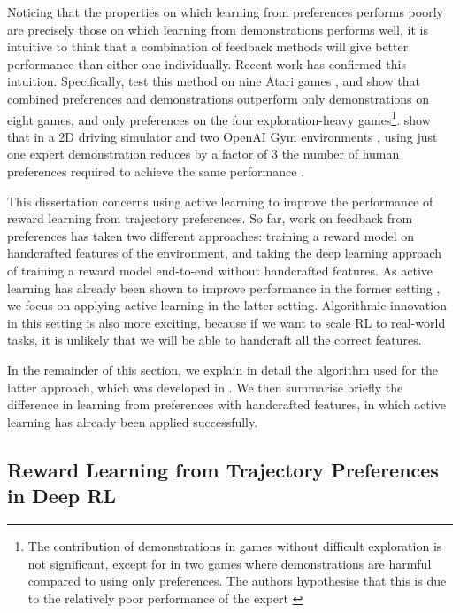 \documentclass[11pt, a4paper, bibliography=totoc]{report}
\begin{document}
Noticing that the properties on which learning from preferences performs poorly are precisely those on which learning from demonstrations performs well, it is intuitive to think that a combination of feedback methods will give better performance than either one individually. Recent work has confirmed this intuition. Specifically, \cite{Ibarz2018} test this method on nine Atari games \cite{bellemare2013arcade}, and show that combined preferences and demonstrations outperform only demonstrations on eight games, and only preferences on the four exploration-heavy games\footnote{The contribution of demonstrations in games without difficult exploration is not significant, except for in two games where demonstrations are harmful compared to using only preferences. The authors hypothesise that this is due to the relatively poor performance of the expert \cite[p.~6]{Ibarz2018}}. \cite{Palan2019} show that in a 2D driving simulator \cite{Byk2017} and two OpenAI Gym environments \cite{brockman2016gym}, using just one expert demonstration reduces by a factor of 3 the number of human preferences required to achieve the same performance \cite[p.~6]{Palan2019}.

This dissertation concerns using active learning to improve the performance of reward learning from trajectory preferences. So far, work on feedback from preferences has taken two different approaches: training a reward model on handcrafted features of the environment, and taking the deep learning approach of training a reward model end-to-end without handcrafted features. As active learning has already been shown to improve performance in the former setting \cite{Byk2017}, we focus on applying active learning in the latter setting. Algorithmic innovation in this setting is also more exciting, because if we want to scale RL to real-world tasks, it is unlikely that we will be able to handcraft all the correct features.

In the remainder of this section, we explain in detail the algorithm used for the latter approach, which was developed in \cite{Christiano2017}. We then summarise briefly the difference in learning from preferences with handcrafted features, in which active learning has already been applied successfully.

\subsection{Reward Learning from Trajectory Preferences in Deep RL}
\end{document}
